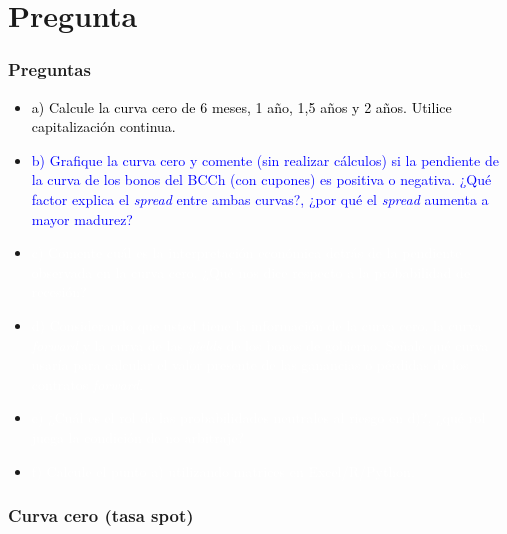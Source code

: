 \documentclass{beamer}
\begin{document}
\section{Pregunta }
\begin{frame}
  \frametitle{Preguntas}
  \begin{itemize}
    \scriptsize
    \item {\textcolor{black}{a) Calcule la curva cero de 6 meses, 1 año, 1,5 años y 2 años. Utilice capitalización continua.}}
    \vspace{3pt}
    \item {\Large\textcolor{blue}{b) Grafique la curva cero y comente (sin realizar cálculos) si la pendiente de la curva de los bonos del BCCh (con cupones) es positiva o negativa. ¿Qué factor explica el \textit{spread} entre ambas curvas?, ¿por qué el \textit{spread} aumenta a mayor madurez?}}
    \vspace{3pt}
    \item {\textcolor{white}{c) Comente cuál es la interpretación económica detrás de la pendiente observada en la curva cero. ¿Qué nos dice respecto a la probabilidad de recesión?}}
    \vspace{3pt}
    \item {\textcolor{white}{d) Considerando que usted tiene la información de la curva cero, la curva \textit{forward} y la curva de las \textit{yields} de los bonos de gobierno. Señale qué curva usaría para calcular el valor presente de las ganancias o pérdidas de los contratos \textit{forward}.}}
    \vspace{3pt}
    \item {\textcolor{white}{e) ¿Cuál es el rol de las probabilidades neutrales al riesgo en d)?, ¿qué rol juega la condición de no arbitraje?}}
    \vspace{3pt}
    \item {\textcolor{white}{f) Calcule el punto a) utilizando matrices en Excel/R/Python.}}
    \vspace{3pt}
  \end{itemize}
\end{frame}
\begin{frame}
  \frametitle{Curva cero (tasa spot)}
  \begin{center}
  \end{center}
\end{frame}
\end{document}
